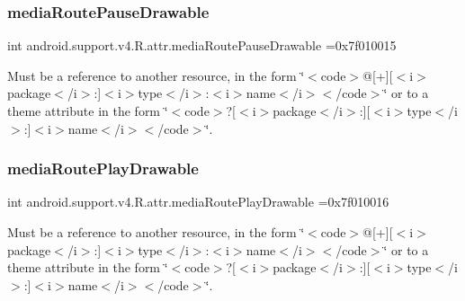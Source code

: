 \subsubsection{\texorpdfstring{media\+Route\+Pause\+Drawable}{mediaRoutePauseDrawable}}
{\footnotesize\ttfamily int android.\+support.\+v4.\+R.\+attr.\+media\+Route\+Pause\+Drawable =0x7f010015\hspace{0.3cm}{\ttfamily [static]}}

Must be a reference to another resource, in the form \char`\"{}$<$code$>$@\mbox{[}+\mbox{]}\mbox{[}$<$i$>$package$<$/i$>$\+:\mbox{]}$<$i$>$type$<$/i$>$\+:$<$i$>$name$<$/i$>$$<$/code$>$\char`\"{} or to a theme attribute in the form \char`\"{}$<$code$>$?\mbox{[}$<$i$>$package$<$/i$>$\+:\mbox{]}\mbox{[}$<$i$>$type$<$/i$>$\+:\mbox{]}$<$i$>$name$<$/i$>$$<$/code$>$\char`\"{}. \mbox{\label{classandroid_1_1support_1_1v4_1_1R_1_1attr_a35785252e897cedea7f5d3b142714130}} 
\subsubsection{\texorpdfstring{media\+Route\+Play\+Drawable}{mediaRoutePlayDrawable}}
{\footnotesize\ttfamily int android.\+support.\+v4.\+R.\+attr.\+media\+Route\+Play\+Drawable =0x7f010016\hspace{0.3cm}{\ttfamily [static]}}

Must be a reference to another resource, in the form \char`\"{}$<$code$>$@\mbox{[}+\mbox{]}\mbox{[}$<$i$>$package$<$/i$>$\+:\mbox{]}$<$i$>$type$<$/i$>$\+:$<$i$>$name$<$/i$>$$<$/code$>$\char`\"{} or to a theme attribute in the form \char`\"{}$<$code$>$?\mbox{[}$<$i$>$package$<$/i$>$\+:\mbox{]}\mbox{[}$<$i$>$type$<$/i$>$\+:\mbox{]}$<$i$>$name$<$/i$>$$<$/code$>$\char`\"{}. \mbox{\label{classandroid_1_1support_1_1v4_1_1R_1_1attr_ad8ca3d50e107f0e94925dc041f82ffaa}} 
